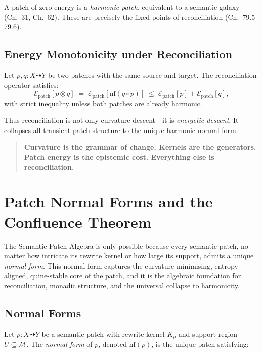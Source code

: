 A patch of zero energy is a \emph{harmonic patch}, equivalent to a semantic galaxy (Ch.~31, Ch.~62).  
These are precisely the fixed points of reconciliation (Ch.~79.5–79.6).

\subsection{Energy Monotonicity under Reconciliation}
\label{subsec:79-2-monotonicity}

Let $p,q : X\dasharrow Y$ be two patches with the same source and target.
The reconciliation operator satisfies:
\[
\mathcal{E}_{\mathrm{patch}}[p\otimes q]
  \;=\;
  \mathcal{E}_{\mathrm{patch}}[\mathrm{nf}(q\circ p)]
  \;\le\;
  \mathcal{E}_{\mathrm{patch}}[p]
  +
  \mathcal{E}_{\mathrm{patch}}[q],
\]
with strict inequality unless both patches are already harmonic.

Thus reconciliation is not only curvature descent—it is \emph{energetic descent}.
It collapses all transient patch structure to the unique harmonic normal form.

\begin{quote}
\textbf{Curvature is the grammar of change.  
Kernels are the generators.  
Patch energy is the epistemic cost.  
Everything else is reconciliation.}
\end{quote}

\section{Patch Normal Forms and the Confluence Theorem}
\label{sec:79-3}

The Semantic Patch Algebra is only possible because every semantic patch,
no matter how intricate its rewrite kernel or how large its support,
admits a unique \emph{normal form}.
This normal form captures the curvature-minimising, entropy-aligned,
quine-stable core of the patch, and it is the algebraic foundation
for reconciliation, monadic structure, and the universal collapse to harmonicity.

\subsection{Normal Forms}
\label{subsec:79-3-normal-forms}

Let $p : X \dasharrow Y$ be a semantic patch with rewrite kernel $K_p$
and support region $U \subseteq \mathcal{M}$.
The \emph{normal form} of $p$, denoted $\mathrm{nf}(p)$, is the unique patch satisfying:

